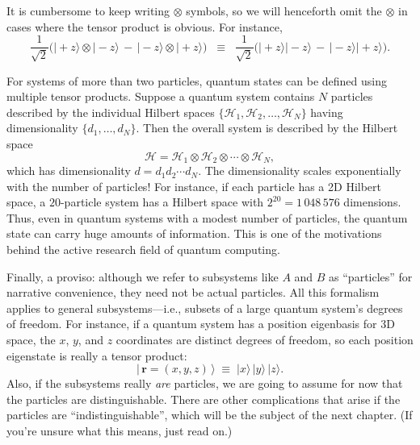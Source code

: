 \documentclass[pra,12pt]{revtex4}
\begin{document}
It is cumbersome to keep writing $\otimes$ symbols, so we will
henceforth omit the $\otimes$ in cases where the tensor product is
obvious.  For instance,
\begin{equation}
  \frac{1}{\sqrt{2}} \Big(|\!+\!z\rangle\otimes|\!-\!z\rangle \,-\, |\!-\!z\rangle\otimes|\!+\!z\rangle\Big) \;\;\equiv \;\; \frac{1}{\sqrt{2}} \Big(|\!+\!z\rangle|\!-\!z\rangle \,-\, |\!-\!z\rangle|\!+\!z\rangle\Big).
\end{equation}

For systems of more than two particles, quantum states can be defined
using multiple tensor products.  Suppose a quantum system contains $N$
particles described by the individual Hilbert spaces $\{\mathscr{H}_1,
\mathscr{H}_2, \dots, \mathscr{H}_N\}$ having dimensionality $\{d_1,
\dots, d_N\}$.  Then the overall system is described by the Hilbert
space
\begin{equation}
  \mathscr{H} = \mathscr{H}_1 \otimes \mathscr{H}_2 \otimes \cdots
  \otimes \mathscr{H}_N,
\end{equation}
which has dimensionality $d = d_1 d_2\cdots d_N$.  The dimensionality
scales exponentially with the number of particles!  For instance, if
each particle has a 2D Hilbert space, a $20$-particle system has a
Hilbert space with $2^{20} =1\,048\,576$ dimensions.  Thus, even in
quantum systems with a modest number of particles, the quantum state
can carry huge amounts of information.  This is one of the motivations
behind the active research field of quantum computing.

Finally, a proviso: although we refer to subsystems like $A$ and $B$
as ``particles'' for narrative convenience, they need not be actual
particles.  All this formalism applies to general subsystems---i.e.,
subsets of a large quantum system's degrees of freedom.  For instance,
if a quantum system has a position eigenbasis for 3D space, the $x$,
$y$, and $z$ coordinates are distinct degrees of freedom, so each
position eigenstate is really a tensor product:
\begin{equation*}
  |\,\mathbf{r} = (x,y,z)\,\rangle \;\equiv\; |x\rangle\, |y\rangle\, |z\rangle.
\end{equation*}
Also, if the subsystems really \textit{are} particles, we are going to
assume for now that the particles are distinguishable.  There are
other complications that arise if the particles are
``indistinguishable'', which will be the subject of the next chapter.
(If you're unsure what this means, just read on.)
\end{document}
